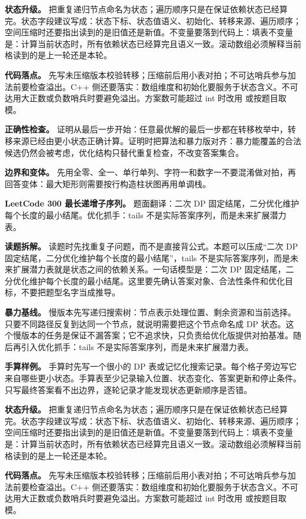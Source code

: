 \textbf{状态升级。} 把重复递归节点命名为状态；遍历顺序只是在保证依赖状态已经算完。状态字段建议写成：状态下标、状态值语义、初始化、转移来源、遍历顺序；空间压缩时还要指出读到的是旧值还是新值。不变量要落到代码上：填表不变量是：计算当前状态时，所有依赖状态已经算完且语义一致。滚动数组必须解释当前格读到的是上一轮还是本轮。

\textbf{代码落点。} 先写未压缩版本校验转移；压缩前后用小表对拍；不可达哨兵参与加法前要检查溢出。C++ 侧还要落实：数组维度和初始化要服务于状态含义。不可达用大正数或负数哨兵时要避免溢出。方案数可能超过 int 时改用  或按题目取模。

\textbf{正确性检查。} 证明从最后一步开始：任意最优解的最后一步都在转移枚举中，转移来源已经由更小状态正确计算。证明时把算法和暴力版对齐：暴力能覆盖的合法候选仍然会被考虑，优化结构只替代重复检查，不改变答案集合。

\textbf{边界和变体。} 先用全零、全一、单行单列、字符一和数字一不要混淆做对拍，再回答变体：最大矩形则需要按行构造柱状图再用单调栈。

\noindent\textbf{LeetCode 300 最长递增子序列。} 题面翻译：二次 DP 固定结尾，二分优化维护每个长度的最小结尾。优化抓手：tails 不是实际答案序列，而是未来扩展潜力表。

\textbf{读题拆解。} 读题时先找重复子问题，而不是直接背公式。本题可以压成“二次 DP 固定结尾，二分优化维护每个长度的最小结尾”，tails 不是实际答案序列，而是未来扩展潜力表就是状态之间的依赖关系。一句话模型是：二次 DP 固定结尾，二分优化维护每个长度的最小结尾。这里要先确认答案对象、合法性条件和优化目标，不要把题型名字当成推导。

\textbf{暴力基线。} 慢版本先写递归搜索树：节点表示处理位置、剩余资源和当前选择。只要不同路径反复到达同一个节点，就说明需要把这个节点命名成 DP 状态。这个慢版本的任务是保证不漏答案；它不追求快，只负责给优化版提供对拍基准。随后再引入优化抓手：tails 不是实际答案序列，而是未来扩展潜力表。

\textbf{手算样例。} 手算时先写一个很小的 DP 表或记忆化搜索记录。每个格子旁边写它来自哪些更小状态。手算表至少记录输入位置、状态变化、答案更新和停止条件。只写最终答案看不出边界，逐轮记录才能发现状态更新顺序是否错。

\textbf{状态升级。} 把重复递归节点命名为状态；遍历顺序只是在保证依赖状态已经算完。状态字段建议写成：状态下标、状态值语义、初始化、转移来源、遍历顺序；空间压缩时还要指出读到的是旧值还是新值。不变量要落到代码上：填表不变量是：计算当前状态时，所有依赖状态已经算完且语义一致。滚动数组必须解释当前格读到的是上一轮还是本轮。

\textbf{代码落点。} 先写未压缩版本校验转移；压缩前后用小表对拍；不可达哨兵参与加法前要检查溢出。C++ 侧还要落实：数组维度和初始化要服务于状态含义。不可达用大正数或负数哨兵时要避免溢出。方案数可能超过 int 时改用  或按题目取模。

